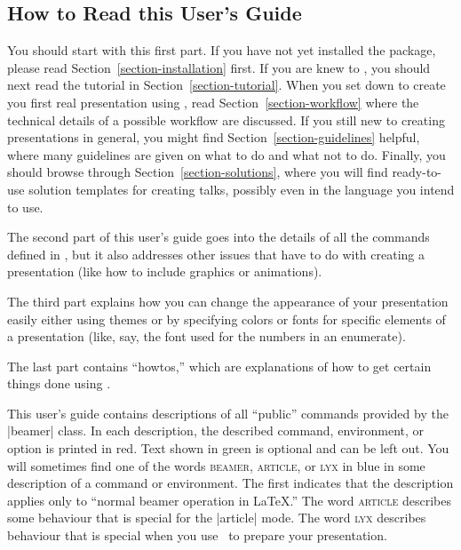\subsection{How to Read this User's Guide}

You should start with this first part. If you have not yet installed
the package, please read Section~\ref{section-installation} first. If 
you are knew to \beamer, you should next read the tutorial in
Section~\ref{section-tutorial}. When you set down to create you first
real presentation using \beamer, read Section~\ref{section-workflow}
where the technical details of a possible workflow are
discussed. If you still new to creating presentations in general, you
might find Section~\ref{section-guidelines} helpful, where many
guidelines are given on what to do and what not to do. Finally, you
should browse through Section~\ref{section-solutions}, where you will
find ready-to-use solution templates for creating talks, possibly even
in the language you intend to use.

The second part of this user's guide goes into the details of all the
commands defined in \beamer, but it also addresses other issues that
have to do with creating a presentation (like how to include
graphics or animations).

The third part explains how you can change the appearance of your
presentation easily either using themes or by specifying colors or
fonts for specific elements of a presentation (like, say, the font
used for the numbers in an enumerate). 

The last part contains ``howtos,'' which are explanations of how to
get certain things done using \beamer.

This user's guide contains descriptions of all ``public''
commands provided by the |beamer| class. In each description, the
described command, environment, or option is printed  in red. Text
shown in green is optional and can be left out. 
You will sometimes find one of the words \textsc{beamer},
\textsc{article}, or \textsc{lyx} in blue in some description of a
command or environment. The first indicates that the description
applies only to ``normal beamer operation in \LaTeX.'' The word
\textsc{article} describes some behaviour that is special for the
|article| mode. The word \textsc{lyx} describes behaviour that is
special when you use \LyX\ to prepare your presentation.  





